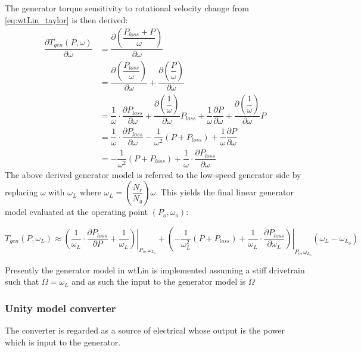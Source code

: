 The generator torque sensitivity to rotational velocity change from \cref{eq:wtLin_taylor} is then derived:
\begin{align}
	\dfrac{\partial T_{gen}(P, \omega)}{\partial \omega} & = \dfrac{\partial \left (\dfrac{P_{loss} +  P}{\omega}\right )}{\partial \omega} \\
	& = \dfrac{\partial \left (\dfrac{P_{loss}}{\omega} \right )}{\partial \omega} + \dfrac{\partial \left (\dfrac{P}{\omega} \right )}{\partial \omega} \\
	& = \dfrac{1}{\omega} \cdot \dfrac{\partial P_{loss}}{\partial \omega} + \dfrac{\partial \left (\dfrac{1}{\omega} \right)}{\partial \omega} P_{loss} + \dfrac{1}{\omega} \dfrac{\partial P}{\partial \omega} + \dfrac{\partial \left (\dfrac{1}{\omega} \right )}{\partial \omega} P \\
	& = \dfrac{1}{\omega} \cdot  \dfrac{\partial P_{loss}}{\partial \omega} - \dfrac{1}{\omega^2}(P + P_{loss}) + \dfrac{1}{\omega} \dfrac{\partial P}{\partial \omega} \\
	& = -\dfrac{1}{\omega^2}(P + P_{loss}) + \dfrac{1}{\omega} \cdot \dfrac{\partial P_{loss}}{\partial \omega}
\end{align}
The above derived generator model is referred to the low-speed generator side by replacing $ \omega $ with $ \omega_L $ where $ \omega_L = \left (\dfrac{N_r}{N_g} \right ) \omega $. This yields the final linear generator model evaluated at the operating point $ (P_o, \omega_o) $:

\begin{equation}
	T_{gen}( P, \omega_L) \approx \left. \left ( \dfrac{1}{\omega_L} \cdot \dfrac{\partial P_{loss}}{\partial P} + \dfrac{1}{\omega_L} \right ) \right |_{P_o,\omega_{L_o}} + \left ( -\dfrac{1}{\omega_L^2}(P + P_{loss}) + \left. \dfrac{1}{\omega_L} \cdot \dfrac{\partial P_{loss}}{\partial \omega_L} \right ) \right |_{P_o,\omega_{L_o}} (\omega_L - \omega_{L_o})
\end{equation}

Presently the generator model in wtLin is implemented assuming a stiff drivetrain such that $ \Omega = \omega_L $ and as such the input to the generator model is $ \Omega $ 

\subsubsection{Unity model converter}
The converter is regarded as a source of electrical whose output is the power which is input to the generator.

